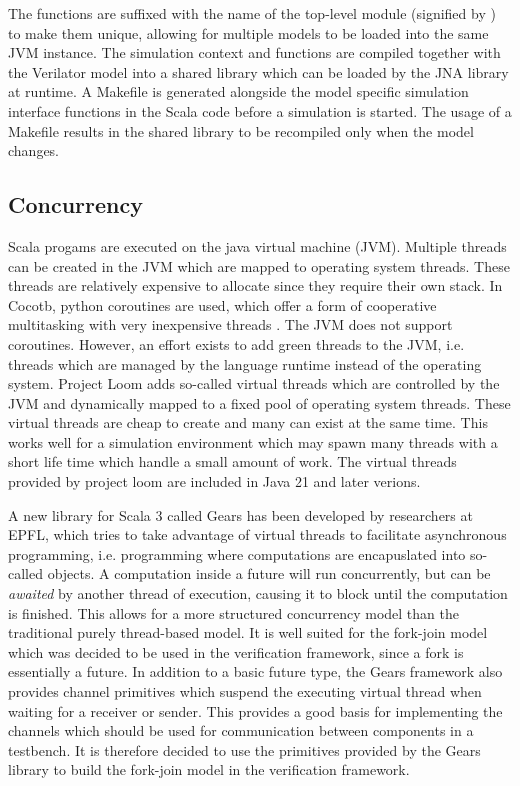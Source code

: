 The functions are suffixed with the name of the top-level module (signified by ) to make them unique,
allowing for multiple models to be loaded into the same JVM instance. The simulation context and functions are
compiled together with the Verilator model into a shared library which can be loaded by the JNA library at runtime. A
Makefile is generated alongside the model specific simulation interface functions in the Scala code before a
simulation is started. The usage of a Makefile results in the shared library to be recompiled only when the model changes.


\subsection{Concurrency} %

Scala progams are executed on the java virtual machine (JVM). Multiple threads can be created in the JVM which are
mapped to operating system threads. These threads are relatively expensive to allocate since they require their own
stack. In Cocotb, python coroutines are used, which offer a form of cooperative multitasking with very inexpensive
threads \cite{pycoroutines}. The JVM does not support coroutines. However, an effort exists to add green threads to
the JVM, i.e. threads which are managed by the language runtime instead of the operating system. Project Loom
\cite{loom} adds so-called virtual threads which are controlled by the JVM and dynamically mapped to a fixed pool of
operating system threads. These virtual threads are cheap to create and many can exist at the same time. This works
well for a simulation environment which may spawn many threads with a short life time which handle a small amount of
work. The virtual threads provided by project loom are included in Java 21 and later verions.

A new library for Scala 3 called Gears \cite{gears} has been developed by researchers at EPFL, which tries to take
advantage of virtual threads to facilitate asynchronous programming, i.e. programming where computations are
encapuslated into so-called  objects. A computation inside a future will run concurrently, but can be
\textit{awaited} by another thread of execution, causing it to block until the computation is finished. This allows
for a more structured concurrency model than the traditional purely thread-based model. It is well suited for the
fork-join model which was decided to be used in the verification framework, since a fork is essentially a future. In
addition to a basic future type, the Gears framework also provides channel primitives which suspend the executing
virtual thread when waiting for a receiver or sender. This provides a good basis for implementing the channels which
should be used for communication between components in a testbench. It is therefore decided to use the primitives
provided by the Gears library to build the fork-join model in the verification framework.

